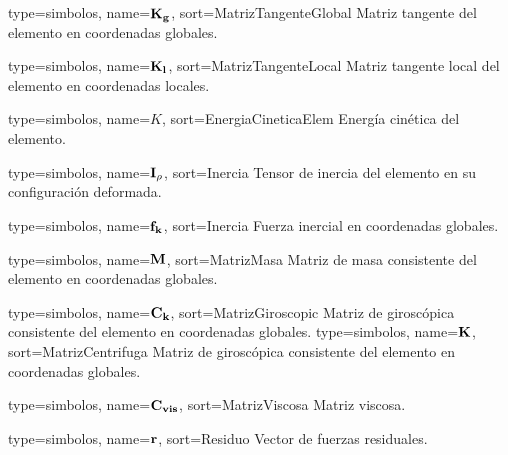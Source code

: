 {
	type={simbolos},
	name={$\bf{K_g}$}, %
	sort={MatrizTangenteGlobal} %
}
{Matriz tangente del elemento en coordenadas globales.}

{
	type={simbolos},
	name={$\bf{K_l}$}, %
	sort={MatrizTangenteLocal} %
}
{Matriz tangente local del elemento en coordenadas locales.}

{
	type={simbolos},
	name={$K$}, %
	sort={EnergiaCineticaElem} %
}
{Energía cinética del elemento.}


{
	type={simbolos},
	name={$\bf{I_{\rho}}$}, %
	sort={Inercia} %
}
{Tensor de inercia del elemento en su configuración deformada.}

{
	type={simbolos},
	name={$\bf{f_k}$}, %
	sort={Inercia} %
}
{Fuerza inercial en coordenadas globales.}

{
	type={simbolos},
	name={$\bf{M}$}, %
	sort={MatrizMasa} %
}
{Matriz de masa consistente del elemento en coordenadas globales.}

{
	type={simbolos},
	name={$\bf{C}_k$}, %
	sort={MatrizGiroscopic} %
}
{Matriz de giroscópica consistente del elemento en coordenadas globales.}
{
	type={simbolos},
	name={$\bf{K}$}, %
	sort={MatrizCentrifuga} %
}
{Matriz de giroscópica consistente del elemento en coordenadas globales.}

{
	type={simbolos},
	name={$\bf{C}_{vis}$}, %
	sort={MatrizViscosa} %
}
{Matriz viscosa.}

{
	type={simbolos},
	name={$\bf{r}$}, %
	sort={Residuo} %
}
{Vector de fuerzas residuales.}

